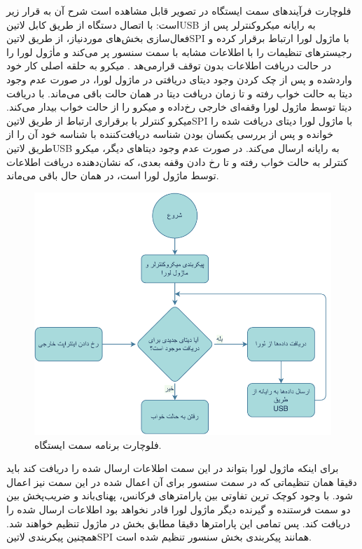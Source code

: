 فلوچارت فرآیند‌های سمت ایستگاه در تصویر  قابل مشاهده است شرح آن به قرار زیر است:
با اتصال دستگاه از طریق کابل ‌لاتین{USB} به رایانه میکروکنترلر پس از فعال‌سازی بخش‌های موردنیاز، از طریق ‌لاتین{SPI} با ماژول لورا ارتباط برقرار کرده و رجیسترهای تنظیمات را با اطلاعات مشابه با سمت سنسور پر می‌کند و ماٰژول لورا را در حالت دریافت اطلاعات بدون توقف  قرارمی‌هد .
میکرو به حلقه اصلی کار خود واردشده و پس از چک کردن وجود دیتای دریافتی در ماژول لورا، در صورت عدم وجود دیتا به حالت خواب  رفته و تا زمان دریافت دیتا در همان حالت باقی می‌ماند.
با دریافت دیتا توسط ماژول لورا وقفه‌ای خارجی رخ‌داده و میکرو را از حالت خواب بیدار می‌کند.
میکرو کنترلر با برقراری ارتباط از طریق ‌لاتین{SPI} با ماژول لورا دیتای دریافت شده را خوانده و پس از بررسی یکسان بودن شناسه دریافت‌کننده با شناسه خود آن را از طریق ‌لاتین{USB} به رایانه ارسال می‌کند.
در صورت عدم وجود دیتاهای دیگر، میکرو کنترلر به حالت خواب رفته و تا رخ دادن وقفه بعدی، که نشان‌دهنده دریافت اطلاعات توسط ماژول لورا است، در همان حال باقی می‌ماند.

\begin{figure}[H]
	\centering
	\includegraphics[width=0.7\linewidth]{Assets/StationFlowChart.pdf}
	\caption{فلوچارت برنامه سمت ایستگاه.}
	\label{fig:StationFlowChart}
\end{figure}

برای اینکه ماژول لورا بتواند در این سمت اطلاعات ارسال شده را دریافت کند باید دقیقا همان تنظیماتی که در سمت سنسور برای آن اعمال شده در این سمت نیز اعمال شود. با وجود کوچک ترین تفاوتی بین پارامتر‌های فرکانس، پهنای‌باند و ضریب‌پخش بین دو سمت فرستنده و گیرنده دیگر ماژول لورا قادر نخواهد بود اطلاعات ارسال شده را دریافت کند. پس تمامی این پارامتر‌ها دقیقا مطابق بخش  در ماژول تنظیم خواهند شد. همچنین پیکربندی ‌لاتین{SPI} همانند پیکربندی بخش سنسور تنظیم شده است. 


